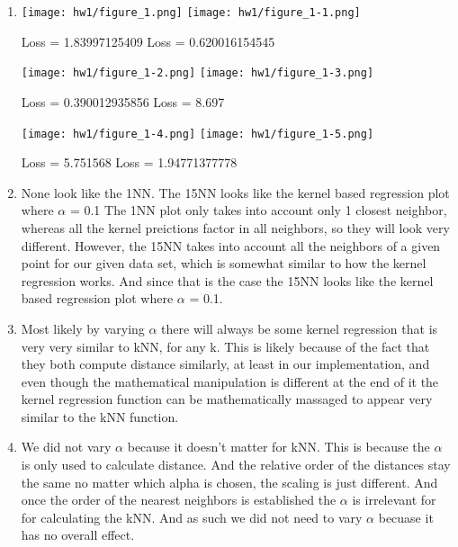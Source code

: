 \documentclass[submit]{harvardml}
\begin{document}
\begin{enumerate}
    \item \hspace{2cm} \newline
\texttt{[image: hw1/figure\_1.png]}
\texttt{[image: hw1/figure\_1-1.png]}
\newline
\begin{center}
    Loss  =  1.83997125409 \hspace{5cm} Loss = 0.620016154545
\end{center}
\texttt{[image: hw1/figure\_1-2.png]}
\texttt{[image: hw1/figure\_1-3.png]}
\newline
\begin{center}
    Loss  =  0.390012935856 \hspace{6cm} Loss  =  8.697
\end{center}
\texttt{[image: hw1/figure\_1-4.png]}
\texttt{[image: hw1/figure\_1-5.png]}
\begin{center}
    Loss  =  5.751568 \hspace{5cm} Loss  =  1.94771377778
\end{center}
    
    \bigskip
    \item
    None look like the 1NN.
    The 15NN looks like the kernel based regression plot where $\alpha$ = 0.1 \newline
    The 1NN plot only takes into account only 1 closest neighbor, whereas all the kernel preictions factor in all neighbors, so they will look very different. However, the 15NN takes into account all the neighbors of a given point for our given data set, which is somewhat similar to how the kernel regression works. And since that is the case the 15NN looks like the kernel based regression plot where $\alpha$ = 0.1.
    
    \bigskip
    \item
    Most likely by varying $\alpha$ there will always be some kernel regression that is very very similar to kNN, for any k. This is likely because of the fact that they both compute distance similarly, at least in our implementation, and even though the mathematical manipulation is different at the end of it the kernel regression function can be mathematically massaged to appear very similar to the kNN function.
    
    \bigskip
    \item
    We did not vary $\alpha$ because it doesn't matter for kNN. This is because the $\alpha$ is only used to calculate distance. And the relative order of the distances stay the same no matter which alpha is chosen, the scaling is just different. And once the order of the nearest neighbors is established the $\alpha$ is irrelevant for for calculating the kNN. And as such we did not need to vary $\alpha$ becuase it has no overall effect.
    
\end{enumerate}
\end{document}
